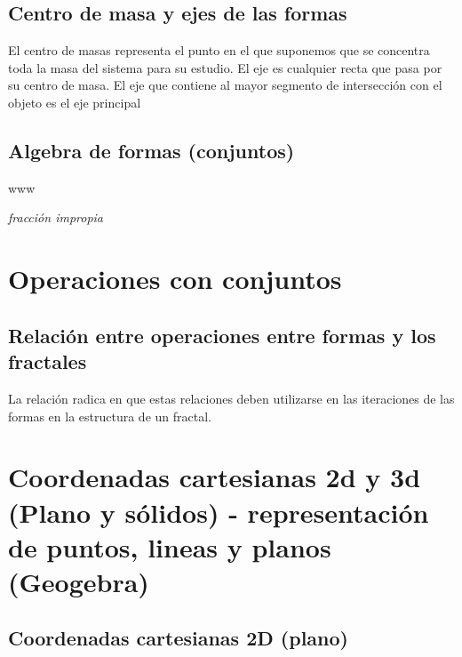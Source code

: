 \documentclass[
  11pt,
]{krantz}
\theoremstyle{definition}
\theoremstyle{definition}
\theoremstyle{definition}
\theoremstyle{definition}
\theoremstyle{remark}
\begin{document}
\hypertarget{centro-de-masa-y-ejes-de-las-formas}{%
\subsection{Centro de masa y ejes de las formas}\label{centro-de-masa-y-ejes-de-las-formas}}

El centro de masas representa el punto en el que suponemos que se concentra toda la masa del sistema para su estudio. El eje es cualquier recta que pasa por su centro de masa. El eje que contiene al mayor segmento de intersección con el objeto es el eje principal

\hypertarget{algebra-de-formas-conjuntos}{%
\subsection{Algebra de formas (conjuntos)}\label{algebra-de-formas-conjuntos}}

www
\citep{leithold1990calculus}

\emph{fracción impropia} 

\hypertarget{operaciones-con-conjuntos}{%
\section{Operaciones con conjuntos}\label{operaciones-con-conjuntos}}

\hypertarget{relaciuxf3n-entre-operaciones-entre-formas-y-los-fractales}{%
\subsection{Relación entre operaciones entre formas y los fractales}\label{relaciuxf3n-entre-operaciones-entre-formas-y-los-fractales}}

La relación radica en que estas relaciones deben utilizarse en las iteraciones de las formas en la estructura de un fractal.

\hypertarget{coordenadas-cartesianas-2d-y-3d-plano-y-suxf3lidos---representaciuxf3n-de-puntos-lineas-y-planos-geogebra}{%
\section{Coordenadas cartesianas 2d y 3d (Plano y sólidos) - representación de puntos, lineas y planos (Geogebra)}\label{coordenadas-cartesianas-2d-y-3d-plano-y-suxf3lidos---representaciuxf3n-de-puntos-lineas-y-planos-geogebra}}

\hypertarget{coordenadas-cartesianas-2d-plano}{%
\subsection{Coordenadas cartesianas 2D (plano)}\label{coordenadas-cartesianas-2d-plano}}
\end{document}
